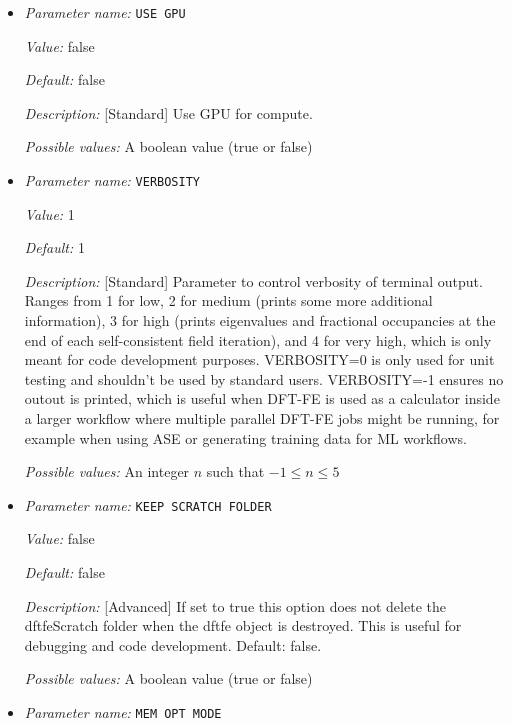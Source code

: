 \begin{itemize}
{\it Possible values:} Any one of GS, MD, NEB, GEOOPT, NONE, NSCF, BANDS, FUNCTIONAL\_TEST
\item {\it Parameter name:} {\tt USE GPU}
\label{parameters:USE GPU}
\label{parameters:USE_20GPU}


{\it Value:} false


{\it Default:} false


{\it Description:} [Standard] Use GPU for compute.


{\it Possible values:} A boolean value (true or false)
\item {\it Parameter name:} {\tt VERBOSITY}
\label{parameters:VERBOSITY}


{\it Value:} 1


{\it Default:} 1


{\it Description:} [Standard] Parameter to control verbosity of terminal output. Ranges from 1 for low, 2 for medium (prints some more additional information), 3 for high (prints eigenvalues and fractional occupancies at the end of each self-consistent field iteration), and 4 for very high, which is only meant for code development purposes. VERBOSITY=0 is only used for unit testing and shouldn't be used by standard users. VERBOSITY=-1 ensures no outout is printed, which is useful when DFT-FE is used as a calculator inside a larger workflow where multiple parallel DFT-FE jobs might be running, for example when using ASE or generating training data for ML workflows.


{\it Possible values:} An integer $n$ such that $-1\leq n \leq 5$

\item {\it Parameter name:} {\tt KEEP SCRATCH FOLDER}
\label{parameters:KEEP SCRATCH FOLDER}
\label{parameters:KEEP_20SCRATCH_20FOLDER}


{\it Value:} false


{\it Default:} false


{\it Description:} [Advanced] If set to true this option does not delete the dftfeScratch folder when the dftfe object is destroyed. This is useful for debugging and code development. Default: false.


{\it Possible values:} A boolean value (true or false)
\item {\it Parameter name:} {\tt MEM OPT MODE}
\label{parameters:MEM OPT MODE}
\label{parameters:MEM_20OPT_20MODE}



\end{itemize}
